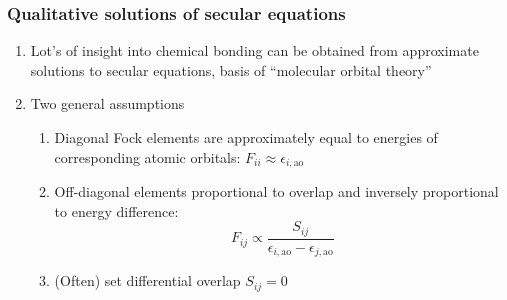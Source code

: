 \documentclass[11pt]{article}
\begin{document}
\subsubsection{Qualitative solutions of secular equations}
\label{sec:orgdc06b53}
\begin{enumerate}
\item Lot's of insight into chemical bonding can be obtained from approximate solutions to secular equations, basis of ``molecular orbital theory''
\item Two general assumptions
\begin{enumerate}
\item Diagonal Fock elements are approximately equal to energies of corresponding atomic orbitals: \(F_{ii} \approx \epsilon_{i,\mathrm{ao}}\)
\item Off-diagonal elements proportional to overlap and inversely proportional to energy difference:
\begin{displaymath}
  F_{ij} \propto \frac{S_{ij}}{\epsilon_{i,\mathrm{ao}}-\epsilon_{j,\mathrm{ao}}}
\end{displaymath}
\item (Often) set differential overlap \(S_{ij}=0\)
\end{enumerate}
\end{enumerate}
\end{document}
